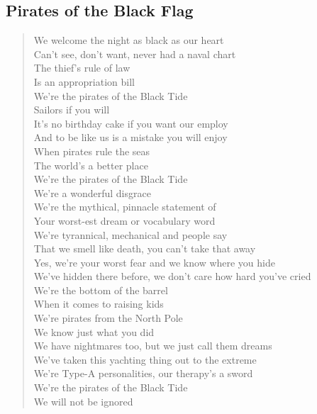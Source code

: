\documentclass[11pt]{article}
\begin{document}
\subsection{Pirates of the Black Flag}
\label{sec:org5f4b3a9}
\begin{verse}
We welcome the night as black as our heart\\
Can't see, don't want, never had a naval chart\\
The thief's rule of law\\
Is an appropriation bill\\
We're the pirates of the Black Tide\\
Sailors if you will\\
\vspace*{1em}
It's no birthday cake if you want our employ\\
And to be like us is a mistake you will enjoy\\
When pirates rule the seas\\
The world's a better place\\
We're the pirates of the Black Tide\\
We're a wonderful disgrace\\
We're the mythical, pinnacle statement of\\
Your worst-est dream or vocabulary word\\
We're tyrannical, mechanical and people say\\
That we smell like death, you can't take that away\\
\vspace*{1em}
Yes, we're your worst fear and we know where you hide\\
We've hidden there before, we don't care how hard you've cried\\
We're the bottom of the barrel\\
When it comes to raising kids\\
We're pirates from the North Pole\\
We know just what you did\\
\vspace*{1em}
We have nightmares too, but we just call them dreams\\
We've taken this yachting thing out to the extreme\\
We're Type-A personalities, our therapy's a sword\\
We're the pirates of the Black Tide\\
We will not be ignored\\

\end{verse}
\end{document}
